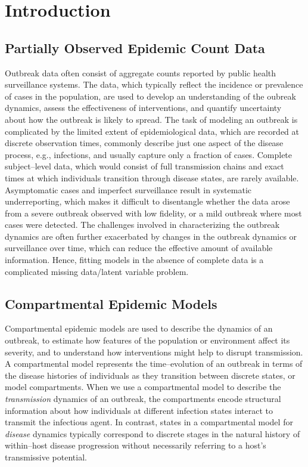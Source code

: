 \chapter{Introduction}
\label{chap:introduction}

\section{Partially Observed Epidemic Count Data}
\label{sec:data_background}

Outbreak data often consist of aggregate counts reported by public health surveillance systems. The data, which typically reflect the incidence or prevalence of cases in the population, are used to develop an understanding of the oubreak dynamics, assess the effectiveness of interventions, and quantify uncertainty about how the outbreak is likely to spread. The task of modeling an outbreak is complicated by the limited extent of epidemiological data, which are recorded at discrete observation times, commonly describe just one aspect of the disease process, e.g., infections, and usually capture only a fraction of cases. Complete subject--level data, which would consist of full transmission chains and exact times at which individuals transition through disease states, are rarely available. Asymptomatic cases and imperfect surveillance result in systematic underreporting, which makes it difficult to disentangle whether the data arose from a severe outbreak observed with low fidelity, or a mild outbreak where most cases were detected. The challenges involved in characterizing the outbreak dynamics are often further exacerbated by changes in the outbreak dynamics or surveillance over time, which can reduce the effective amount of available information. Hence, fitting models in the absence of complete data is a complicated missing data/latent variable problem. 

\section{Compartmental Epidemic Models}
\label{sec:outbreak_models}

Compartmental epidemic models are used to describe the dynamics of an outbreak, to estimate how features of the population or environment affect its severity, and to understand how interventions might help to disrupt transmission. A compartmental model represents the time--evolution of an outbreak in terms of the disease histories of individuals as they transition between discrete states, or model compartments. When we use a compartmental model to describe the \textit{transmission} dynamics of an outbreak, the compartments encode structural information about how individuals at different infection states interact to transmit the infectious agent. In contrast, states in a compartmental model for \textit{disease} dynamics typically correspond to discrete stages in the natural history of within--host disease progression without necessarily referring to a host's transmissive potential. 

